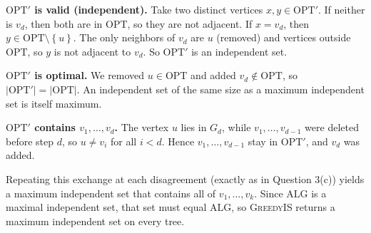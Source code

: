 \documentclass[11pt]{article}
\newcommand{\set}[1]{\left\{#1\right\}}
\newcommand{\abs}[1]{\left|#1\right|}
\newcommand{\OPT}{\mathrm{OPT}}
\newcommand{\ALG}{\mathrm{ALG}}
\newcommand{\algo}[1]{\textsc{#1}}
\begin{document}
\textbf{$\OPT'$ is valid (independent).}
Take two distinct vertices $x,y \in \OPT'$.
If neither is $v_d$, then both are in $\OPT$, so they are not adjacent.
If $x = v_d$, then $y \in \OPT \setminus \set{u}$.
The only neighbors of $v_d$ are $u$ (removed) and vertices outside $\OPT$, so $y$ is not adjacent to $v_d$.
So $\OPT'$ is an independent set.

\textbf{$\OPT'$ is optimal.}
We removed $u \in \OPT$ and added $v_d \notin \OPT$, so $\abs{\OPT'} = \abs{\OPT}$.
An independent set of the same size as a maximum independent set is itself maximum.

\textbf{$\OPT'$ contains $v_1,\dots,v_d$.}
The vertex $u$ lies in $G_d$, while $v_1,\dots,v_{d-1}$ were deleted before step $d$, so $u \ne v_i$ for all $i<d$.
Hence $v_1,\dots,v_{d-1}$ stay in $\OPT'$, and $v_d$ was added.

Repeating this exchange at each disagreement (exactly as in Question 3(c)) yields a maximum independent set that contains all of $v_1,\dots,v_k$.
Since $\ALG$ is a maximal independent set, that set must equal $\ALG$, so \algo{GreedyIS} returns a maximum independent set on every tree.
    
\end{document}
